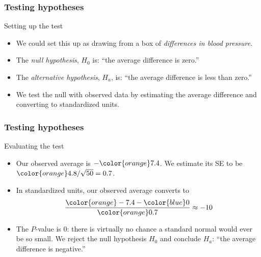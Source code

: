 \documentclass[handout]{beamer}
\begin{document}

   \begin{frame} \frametitle{Testing hypotheses}

   \begin{block}
   {Setting up the test}
   \begin{itemize}

   \item We could set this up as drawing from a box of {\em differences
   in blood pressure}.

   \item The {\em null hypothesis}, $H_0$ is: ``the average difference is zero.''

   \item The {\em alternative hypothesis}, $H_a$, is: ``the average difference is less than zero.''

   \item We test the null with observed data by estimating
    the average difference and converting to standardized units.
   \end{itemize}
   \end{block}
   \end{frame}


   \begin{frame} \frametitle{Testing hypotheses}

   \begin{block}
   {Evaluating  the test}
   \begin{itemize}

   \item Our observed average is ${-\color{orange} 7.4}$. We estimate its SE
   to be ${\color{orange} 4.8 / \sqrt{50}=0.7}$.

    \item In standardized units, our observed average converts to
    $$
    \frac{{\color{orange}-7.4} - {\color{blue} 0}}{\color{orange} 0.7} \approx - 10
    $$

   \item The {\color{orange} $P$-value} is 0: there is virtually no chance
   a standard normal would ever be so small. We reject the null hypothesis $H_0$
   and conclude $H_a$: ``the average difference is negative.''


   \end{itemize}
   \end{block}
   \end{frame}
\end{document}
